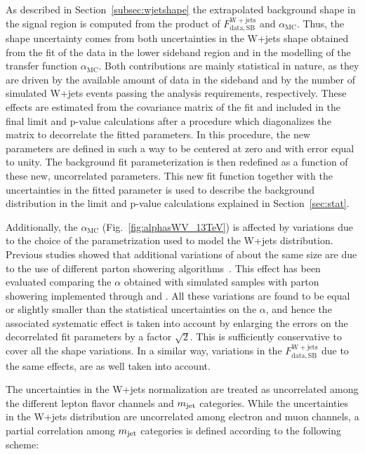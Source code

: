 As described in Section~\ref{subsec:wjetshape} the extrapolated background shape in the signal region is computed from the product of $F_\mathrm{data, SB}^{\mathrm{W+jets}}$ and $\alpha_\mathrm{MC}$.
Thus, the shape uncertainty comes from both uncertainties in the W+jets \mlvj shape obtained from the fit of the data in the lower \mJ sideband region and in the modelling of the transfer function $\alpha_\mathrm{MC}$.
Both contributions are mainly statistical in nature, as they are driven by the available amount of data in the sideband and by the number of simulated W+jets events passing the analysis requirements, respectively.
These effects are estimated from the covariance matrix of the fit and included in the final limit and p-value calculations after a procedure which diagonalizes the matrix to decorrelate the fitted parameters.
In this procedure, the new parameters are defined in such a way to be centered at zero and with error equal to unity. The background fit parameterization is then redefined as a function of these new, uncorrelated parameters.
This new fit function together with the uncertainties in the fitted parameter is used to describe the background distribution in the limit and p-value calculations explained in Section~\ref{sec:stat}.

Additionally, the $\alpha_\mathrm{MC}$ (Fig.~\ref{fig:alphasWV_13TeV}) is affected by variations due to the choice of the parametrization used to model the W+jets distribution.
Previous studies showed that additional variations of about the same size are due to the use of different parton showering algorithms~\cite{Khachatryan:2014gha}. This effect has been evaluated comparing the $\alpha$ obtained with simulated samples with parton showering implemented through \HERWIG{++} and \PYTHIA{}. All these variations are found to be equal or slightly smaller than the statistical uncertainties on the $\alpha$, and hence the associated systematic effect is taken into account by enlarging the errors on the decorrelated fit parameters by a factor $\sqrt{2}$. This is sufficiently conservative to cover all the shape variations.
In a similar way, variations in the $F_\mathrm{data, SB}^{\mathrm{W+jets}}$ due to the same effects, are as well taken into account.

The uncertainties in the W+jets normalization are treated as uncorrelated among the different lepton flavor channels and $m_{\text{jet}}$ categories.
While the uncertainties in the W+jets distribution are uncorrelated among electron and muon channels, a partial correlation among $m_{\text{jet}}$ categories is defined according to the following scheme:

